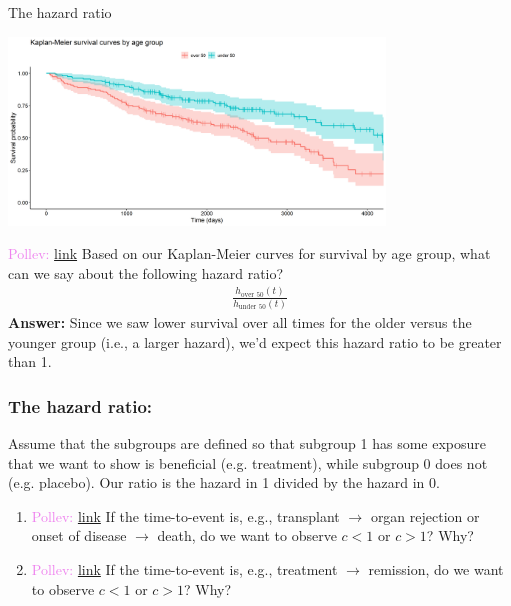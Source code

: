 \documentclass[10pt,t]{beamer}
\begin{document}
\begin{frame}{The hazard ratio}
	
	\vspace{-5 mm}
	
	\begin{center}
		\includegraphics[width =
		0.75\textwidth]{figs/KM_strat_age.png}
	\end{center}
	
	\textcolor{violet}{Pollev: \href{https://PollEv.com/multiple_choice_polls/4DTnIoWlPiGVIuEXHBgdX/respond}{link}} Based on our Kaplan-Meier curves for survival by age group, what can we say about the following hazard ratio?
	\begin{align*}
		\frac{h_{\text{over 50}}(t)}{h_{\text{under 50}}(t)}
	\end{align*}   \pause
	\textbf{Answer:} Since we saw lower survival over all times for the older versus the younger group (i.e., a larger hazard), we'd expect this hazard ratio to be greater than 1.
\end{frame}

\begin{frame}
\frametitle{The hazard ratio: }
Assume that the subgroups are defined so that subgroup 1 has some exposure that we want to show is beneficial (e.g. treatment), while subgroup 0 does not (e.g. placebo). Our ratio is the hazard in 1 divided by the hazard in 0.

\bigskip

\begin{enumerate}
\item  \textcolor{violet}{Pollev: \href{https://PollEv.com/multiple_choice_polls/EHuS4JTIVyEO4P5ixpg25/respond}{link}} If the time-to-event is, e.g., transplant $\rightarrow$ organ rejection or onset of disease $\rightarrow$ death, do we want to observe $c < 1$ or $c > 1$? Why? 

\bigskip

 \item \textcolor{violet}{Pollev: \href{https://PollEv.com/multiple_choice_polls/zRGRi6HkQPwR2bKxIS9pG/respond}{link}} If the time-to-event is, e.g., treatment $\rightarrow$ remission, do we want to observe $c < 1$ or $c > 1$? Why?
\end{enumerate}
\end{frame}
\end{document}
